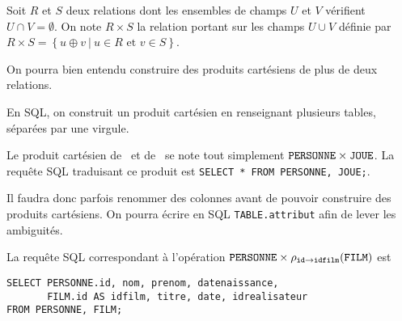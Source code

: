 \begin{defi}
  Soit $R$ et $S$ deux relations dont les ensembles de champs $U$ et $V$ vérifient
  $U\cap V =\emptyset$. On note $R\times S$ la relation portant sur les champs $U\cup
  V$ définie par
$
    R\times S  = \left\{u\oplus v ~|~ u\in R \text{ et } v\in S\right\} $.
    
  On pourra bien entendu construire des produits cartésiens de plus de deux relations. 
\end{defi}

En SQL, on construit un produit cartésien en renseignant plusieurs tables, séparées par une virgule. 
\begin{exemple}
  Le produit cartésien de \PERSONNE\ et de \JOUE\ se note tout simplement $\mathtt{PERSONNE} \times \mathtt{JOUE}$. 
  La requête SQL traduisant ce produit est \verb+SELECT * FROM PERSONNE, JOUE;+.

\end{exemple}


\begin{rem}
  Il faudra donc parfois renommer des colonnes avant de pouvoir construire des produits cartésiens. 
  On pourra écrire en SQL \texttt{TABLE.attribut} afin de lever les ambiguités. 
\end{rem}

\begin{exemple}
  La requête SQL correspondant à l'opération $\mathtt{PERSONNE} \times \rho_{\mathtt{id} \rightarrow \mathtt{idfilm}}(\mathtt{FILM})$ est
\begin{verbatim}
SELECT PERSONNE.id, nom, prenom, datenaissance, 
       FILM.id AS idfilm, titre, date, idrealisateur
FROM PERSONNE, FILM;
\end{verbatim}

\end{exemple}



